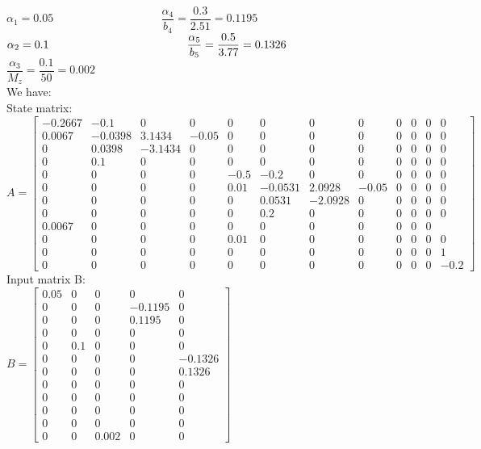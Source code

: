 \documentclass[14pt,a4paper]{article}
\begin{document}
	\hspace*{2cm} $ \alpha_1 = 0.05 \hspace{4cm} \dfrac{\alpha_4}{b_4} = \dfrac{0.3}{2.51} = 0.1195 $ \\
	\hspace*{2.5cm} $ \alpha_2 = 0.1 \hspace{4.3cm} \dfrac{\alpha_5}{b_5} = \dfrac{0.5}{3.77} = 0.1326 $ \\
	\hspace*{2.5cm} $ \dfrac{\alpha_3}{M_z} = \dfrac{0.1}{50} = 0.002 $ \\

	\pagebreak
	We have: \\
	State matrix: \\
	$ A = \begin{bmatrix} -0.2667 & -0.1 & 0&0&0&0&0&0&0&0&0&0 \\ 0.0067 & -0.0398 & 3.1434 & -0.05 &0&0&0&0&0&0&0&0 \\ 0& 0.0398 & -3.1434 & 0&0&0&0&0&0&0&0&0 \\ 0 & 0.1 &0&0&0&0&0&0&0&0&0&0 \\ 0&0&0&0& -0.5 & -0.2 & 0&0&0&0&0&0 \\ 0&0&0&0& 0.01 & -0.0531 & 2.0928 & -0.05 & 0&0&0&0 \\ 0&0&0&0&0& 0.0531 & -2.0928 & 0&0&0&0&0 \\ 0&0&0&0&0& 0.2 &0&0&0&0&0&0 \\ 0.0067 &0&0&0&0&0&0&0&0&0&0 \\ 0&0&0&0& 0.01 &0&0&0&0&0&0 &0 \\ 0&0&0&0&0&0&0&0&0&0&0&1 \\ 0&0&0&0&0&0&0&0&0&0&0& -0.2 \end{bmatrix} $ \\
	
	Input matrix B: \\
	\hspace*{2cm} $ B = \begin{bmatrix} 0.05 &0&0&0&0 \\ 0&0&0& -0.1195 & 0 \\ 0&0&0& 0.1195 & 0 \\ 0&0&0&0&0 \\ 0& 0.1 &0&0&0 \\ 0&0&0&0& -0.1326 \\ 0&0&0&0 & 0.1326 \\ 0&0&0&0&0 \\ 0&0&0&0&0 \\ 0&0&0&0&0 \\ 0&0&0&0&0 \\ 0&0& 0.002 &0&0 \end{bmatrix}$ 
	
\end{document}
